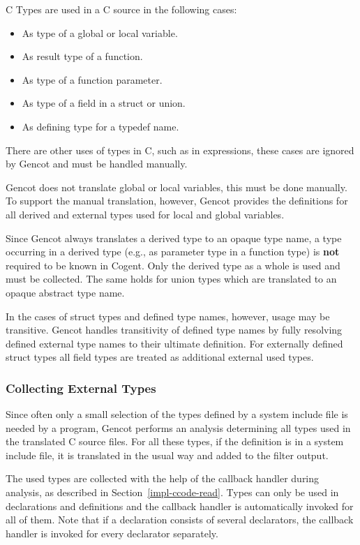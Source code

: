 C Types are used in a C source in the following cases:
\begin{itemize}
\item As type of a global or local variable.
\item As result type of a function.
\item As type of a function parameter.
\item As type of a field in a struct or union.
\item As defining type for a typedef name.
\end{itemize}
There are other uses of types in C, such as in  expressions, these cases are ignored by Gencot and 
must be handled manually.

Gencot does not translate global or local variables, this must be done manually. To support the manual translation, 
however, Gencot provides the definitions for all derived and external types used for local and global variables.

Since Gencot always translates a derived type to an opaque type name, a type occurring in a derived type (e.g.,
as parameter type in a function type) is \textbf{not} required to be known in Cogent. Only the derived type
as a whole is used and must be collected. The same holds for union types which are translated to an opaque
abstract type name.

In the cases of struct types and defined type names, however, usage may be transitive. Gencot handles transitivity
of defined type names by fully resolving defined external type names to their ultimate definition. For externally
defined struct types all field types are treated as additional external used types. 

\subsubsection{Collecting External Types}

Since often only a small selection of the types defined by a system include file is needed by a program, Gencot performs 
an analysis determining all types used in the translated C source files. For all these types, if the definition is in a 
system include file, it is translated in the usual way and added to the filter output.

The used types are collected with the help of the callback handler during analysis, as described in 
Section~\ref{impl-ccode-read}. Types can only be used in declarations and definitions and the callback handler is
automatically invoked for all of them. Note that if a declaration consists of several declarators, the callback
handler is invoked for every declarator separately. 

